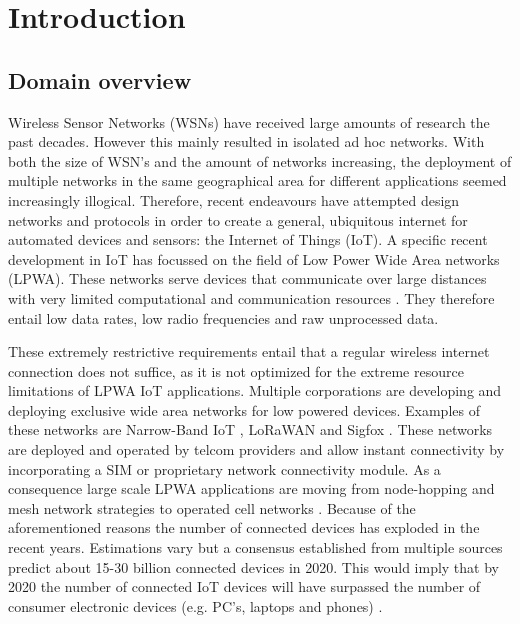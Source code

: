 \chapter{Introduction}

\section{Domain overview} 
Wireless Sensor Networks (WSNs) have received large amounts of research the past decades. However this mainly resulted in isolated ad hoc networks. With both the size of WSN's and the amount of networks increasing, the deployment of multiple networks in the same geographical area for different applications seemed increasingly illogical. Therefore, recent endeavours have attempted design networks and protocols in order to create a general, ubiquitous internet for automated devices and sensors: the Internet of Things (IoT). A specific recent development in IoT has focussed on the field of Low Power Wide Area networks (LPWA). These networks serve devices that communicate over large distances with very limited computational and communication resources \cite{value_of}. They therefore entail low data rates, low radio frequencies and raw unprocessed data. 

These extremely restrictive requirements entail that a regular wireless internet connection does not suffice, as it is not optimized for the extreme resource limitations of LPWA IoT applications. Multiple corporations are developing and deploying exclusive wide area networks for low powered devices. Examples of these networks are Narrow-Band IoT \cite{nbiot}, LoRaWAN \cite{web:lora} and Sigfox \cite{web:sigfox}. These networks are deployed and operated by telcom providers and allow instant connectivity by incorporating a SIM or proprietary network connectivity module. As a consequence large scale LPWA applications are moving from node-hopping and mesh network strategies to operated cell networks \cite{movement_to_cellular, movement_to_cellular_2}. Because of the aforementioned reasons the number of connected devices has exploded in the recent years. Estimations vary but a consensus established from multiple sources predict about 15-30 billion connected devices in 2020. This would imply that by 2020 the number of connected IoT devices will have surpassed the number of consumer electronic devices (e.g. PC's, laptops and phones) \cite{nr_devices_gartner, nr_devices_forbes, security_risks_ocean_connect, nr_devices_ericsson}.

